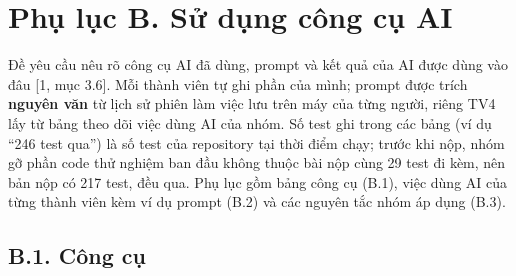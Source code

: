 \section{Phụ lục B. Sử dụng công cụ AI}

Đề yêu cầu nêu rõ công cụ AI đã dùng, prompt và kết quả của AI được dùng vào đâu {[}1, mục 3.6{]}. Mỗi thành viên tự ghi phần của mình; prompt được trích \textbf{nguyên văn} từ lịch sử phiên làm việc lưu trên máy của từng người, riêng TV4 lấy từ bảng theo dõi việc dùng AI của nhóm. Số test ghi trong các bảng (ví dụ ``246 test qua'') là số test của repository tại thời điểm chạy; trước khi nộp, nhóm gỡ phần code thử nghiệm ban đầu không thuộc bài nộp cùng 29 test đi kèm, nên bản nộp có 217 test, đều qua. Phụ lục gồm bảng công cụ (B.1), việc dùng AI của từng thành viên kèm ví dụ prompt (B.2) và các nguyên tắc nhóm áp dụng (B.3).

\subsection{B.1. Công cụ}


